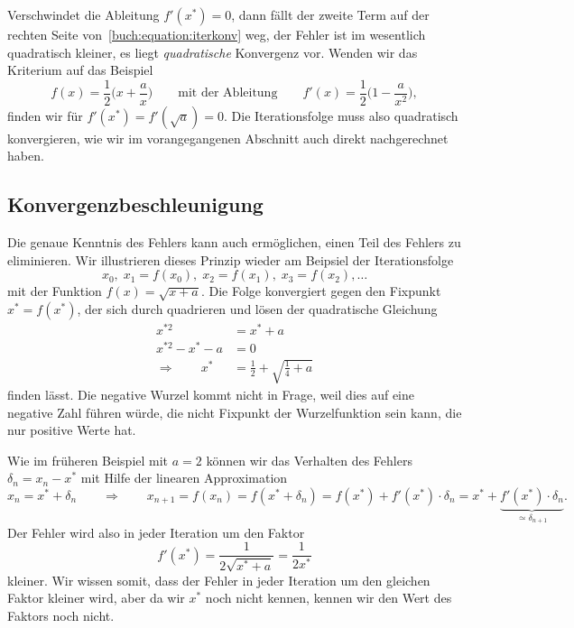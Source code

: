 Verschwindet die Ableitung $f'(x^*)=0$, dann fällt der zweite Term
auf der rechten Seite von~\eqref{buch:equation:iterkonv} weg, der
Fehler ist im wesentlich quadratisch kleiner, es liegt {\em quadratische}
Konvergenz vor.
Wenden wir das Kriterium auf das Beispiel 
\[
f(x) = \frac12\biggl( x + \frac{a}{x}\biggr)
\qquad\text{mit der Ableitung}\qquad
f'(x) = \frac12\biggl( 1 -\frac{a}{x^2}\biggr),
\]
finden wir für $f'(x^*)=f'(\sqrt{a}) = 0$.
Die Iterationsfolge muss also quadratisch konvergieren, wie wir
im vorangegangenen Abschnitt auch direkt nachgerechnet haben.

%
%
\subsection{Konvergenzbeschleunigung
\label{buch:subsection:konvergenzbeschleunigung}}
Die genaue Kenntnis des Fehlers kann auch ermöglichen, einen Teil
des Fehlers zu eliminieren.
Wir illustrieren dieses Prinzip wieder am Beipsiel der Iterationsfolge
\[
x_0,\; x_1=f(x_0),\; x_2=f(x_1),\;x_3=f(x_2),\dots
\]
mit der Funktion $f(x)=\sqrt{x+a}$.
Die Folge konvergiert gegen den Fixpunkt $x^* = f(x^*)$, der
sich durch quadrieren und lösen der quadratische
Gleichung
\begin{align*}
x^{*2} &= x^*+a\\
x^{*2} - x^*-a&=0\\
\Rightarrow\qquad
x^* &= \frac12 +\sqrt{\frac14+a}
\end{align*}
finden lässt.
Die negative Wurzel kommt nicht in Frage, weil dies auf eine negative Zahl
führen würde, die nicht Fixpunkt der Wurzelfunktion sein kann, die nur
positive Werte hat.

Wie im früheren Beispiel mit $a=2$ können wir das Verhalten des Fehlers
$\delta_n = x_n-x^*$
mit Hilfe der linearen Approximation
\[
x_n = x^* + \delta_n
\qquad\Rightarrow\qquad
x_{n+1} = f(x_n) = f(x^* + \delta_n) = f(x^*) + f'(x^*)\cdot \delta_n
=
x^* + \underbrace{f'(x^*)\cdot \delta_n}_{\displaystyle\simeq\delta_{n+1}}.
\]
Der Fehler wird also in jeder Iteration um den Faktor
\[
f'(x^*) = \frac1{2\sqrt{x^*+a}}=\frac1{2x^*}
\]
kleiner.
Wir wissen somit, dass der Fehler in jeder Iteration um den gleichen Faktor
kleiner wird, aber da wir $x^*$ noch nicht kennen, kennen wir den Wert
des Faktors noch nicht.


